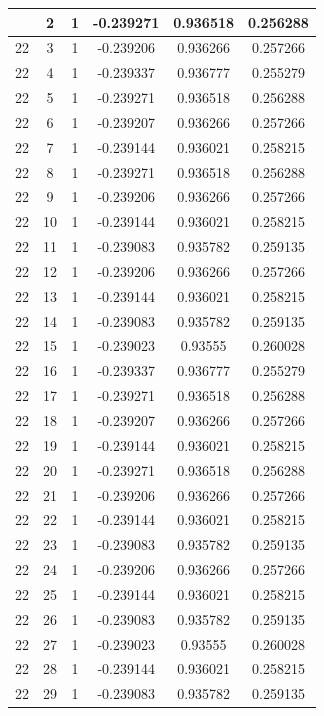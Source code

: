 \documentclass[12pt,a4paper]{article}
\numberwithin{equation}{section}
\numberwithin{figure}{section}
\numberwithin{table}{section}
\begin{document}
\begin{longtable}{|c|c|c|c|c|c|}
\pagebreak
22 & 2 & 1 & -0.239271 & 0.936518 & 0.256288 \\ \hline
22 & 3 & 1 & -0.239206 & 0.936266 & 0.257266 \\ \hline
22 & 4 & 1 & -0.239337 & 0.936777 & 0.255279 \\ \hline
22 & 5 & 1 & -0.239271 & 0.936518 & 0.256288 \\ \hline
22 & 6 & 1 & -0.239207 & 0.936266 & 0.257266 \\ \hline
22 & 7 & 1 & -0.239144 & 0.936021 & 0.258215 \\ \hline
22 & 8 & 1 & -0.239271 & 0.936518 & 0.256288 \\ \hline
22 & 9 & 1 & -0.239206 & 0.936266 & 0.257266 \\ \hline
22 & 10 & 1 & -0.239144 & 0.936021 & 0.258215 \\ \hline
22 & 11 & 1 & -0.239083 & 0.935782 & 0.259135 \\ \hline
22 & 12 & 1 & -0.239206 & 0.936266 & 0.257266 \\ \hline
22 & 13 & 1 & -0.239144 & 0.936021 & 0.258215 \\ \hline
22 & 14 & 1 & -0.239083 & 0.935782 & 0.259135 \\ \hline
22 & 15 & 1 & -0.239023 & 0.93555 & 0.260028 \\ \hline
22 & 16 & 1 & -0.239337 & 0.936777 & 0.255279 \\ \hline
22 & 17 & 1 & -0.239271 & 0.936518 & 0.256288 \\ \hline
22 & 18 & 1 & -0.239207 & 0.936266 & 0.257266 \\ \hline
22 & 19 & 1 & -0.239144 & 0.936021 & 0.258215 \\ \hline
22 & 20 & 1 & -0.239271 & 0.936518 & 0.256288 \\ \hline
22 & 21 & 1 & -0.239206 & 0.936266 & 0.257266 \\ \hline
22 & 22 & 1 & -0.239144 & 0.936021 & 0.258215 \\ \hline
22 & 23 & 1 & -0.239083 & 0.935782 & 0.259135 \\ \hline
22 & 24 & 1 & -0.239206 & 0.936266 & 0.257266 \\ \hline
22 & 25 & 1 & -0.239144 & 0.936021 & 0.258215 \\ \hline
22 & 26 & 1 & -0.239083 & 0.935782 & 0.259135 \\ \hline
22 & 27 & 1 & -0.239023 & 0.93555 & 0.260028 \\ \hline
22 & 28 & 1 & -0.239144 & 0.936021 & 0.258215 \\ \hline
22 & 29 & 1 & -0.239083 & 0.935782 & 0.259135 \\ \hline

\end{longtable}
\end{document}
